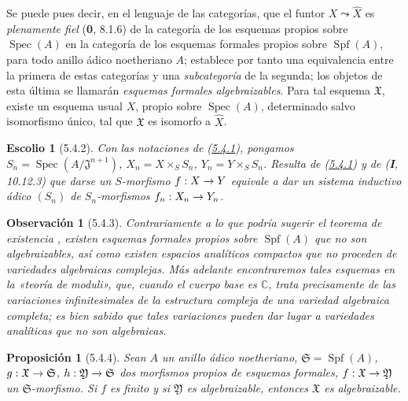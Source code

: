 \documentclass[10pt,oneside,openany]{book}
\theoremstyle{egaenv}\newtheorem*{env}{---}
\theoremstyle{egastatement}
\newtheorem*{proposition}{Proposición}
\theoremstyle{egadescription}
\newtheorem*{remark}{Observación}
\newtheorem*{scholium}{Escolio}
\renewcommand{\to}{\mathchoice{\longrightarrow}{\rightarrow}{\rightarrow}{\rightarrow}}
\begin{document}
Se puede pues decir, en el lenguaje de las categorías, que el funtor
$X\leadsto\widehat X$ es \emph{plenamente fiel} (\textbf{0}, 8.1.6) de la categoría de los
esquemas propios sobre $\operatorname{Spec}(A)$ en la categoría de los esquemas formales
propios sobre $\operatorname{Spf}(A)$, para todo anillo ádico noetheriano $A$;
establece por tanto una equivalencia entre la primera de estas categorías y una
\emph{subcategoría} de la segunda; los objetos de esta última se llamarán
\emph{esquemas formales algebraizables}. Para tal esquema $\mathfrak X$, existe
un esquema usual $X$, propio sobre $\operatorname{Spec}(A)$, determinado salvo isomorfismo
único, tal que $\mathfrak X$ es isomorfo a $\widehat X$.

\begin{scholium}[5.4.2]
\label{III.5.4.2-fr}
Con las notaciones de (\hyperref[III.5.4.1-fr]{5.4.1}), pongamos
$S_n=\operatorname{Spec}(A/\mathfrak J^{n+1})$,
$X_n=X\times_S S_n$, $Y_n=Y\times_S S_n$. Resulta de
(\hyperref[III.5.4.1-fr]{5.4.1}) y de (\textbf{I}, 10.12.3) que darse un
$S$-morfismo $f:X\to Y$ \emph{equivale} a dar un sistema inductivo
ádico $(S_n)$  de
$S_n$-morfismos $f_n:X_n\to Y_n$.
\end{scholium}

\begin{remark}[5.4.3]
\label{III.5.4.3}
\label{III.5.4.3-fr}
Contrariamente a lo que podría sugerir el teorema de existencia
, existen esquemas formales propios sobre $\operatorname{Spf}(A)$
que \emph{no son algebraizables}, así como existen espacios analíticos
compactos que no proceden de variedades algebraicas complejas. Más
adelante encontraremos tales esquemas en la «teoría de moduli»,
que, cuando el cuerpo base es $\mathbb C$, trata precisamente de las
variaciones infinitesimales de la estructura compleja de una variedad
algebraica completa; es bien sabido que tales variaciones pueden dar
lugar a variedades analíticas que no son algebraicas.
\end{remark}

\begin{proposition}[5.4.4]
\label{III.5.4.4-fr}
Sean $A$ un anillo ádico noetheriano, $\mathfrak S=\operatorname{Spf}(A)$,
$g:\mathfrak X\to\mathfrak S$, $h:\mathfrak Y\to\mathfrak S$ dos morfismos
propios de esquemas formales, $f:\mathfrak X\to\mathfrak Y$ un
$\mathfrak S$-morfismo. Si $f$ es finito y si $\mathfrak Y$ es algebraizable,
entonces $\mathfrak X$ es algebraizable.
\end{proposition}
\end{document}
